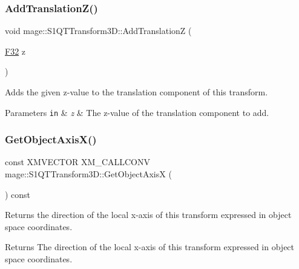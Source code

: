 \subsubsection{\texorpdfstring{Add\+Translation\+Z()}{AddTranslationZ()}}
{\footnotesize\ttfamily void mage\+::\+S1\+Q\+T\+Transform3\+D\+::\+Add\+TranslationZ (\begin{DoxyParamCaption}\item[{\mbox{\hyperlink{namespacemage_aa97e833b45f06d60a0a9c4fc22ae02c0}{F32}}}]{z }\end{DoxyParamCaption})\hspace{0.3cm}{\ttfamily [noexcept]}}

Adds the given z-\/value to the translation component of this transform.


\begin{DoxyParams}[1]{Parameters}
\mbox{\tt in}  & {\em z} & The z-\/value of the translation component to add. \\
\hline
\end{DoxyParams}
\mbox{\label{classmage_1_1_s1_q_t_transform3_d_a44f76c6dedb6e5d4641764bcf5e2829d}} 
\subsubsection{\texorpdfstring{Get\+Object\+Axis\+X()}{GetObjectAxisX()}}
{\footnotesize\ttfamily const X\+M\+V\+E\+C\+T\+OR X\+M\+\_\+\+C\+A\+L\+L\+C\+O\+NV mage\+::\+S1\+Q\+T\+Transform3\+D\+::\+Get\+Object\+AxisX (\begin{DoxyParamCaption}{ }\end{DoxyParamCaption}) const\hspace{0.3cm}{\ttfamily [noexcept]}}

Returns the direction of the local x-\/axis of this transform expressed in object space coordinates.

\begin{DoxyReturn}{Returns}
The direction of the local x-\/axis of this transform expressed in object space coordinates. 
\end{DoxyReturn}
\mbox{\label{classmage_1_1_s1_q_t_transform3_d_a92f5aff468e388295fdfa0eedf44e436}} 
